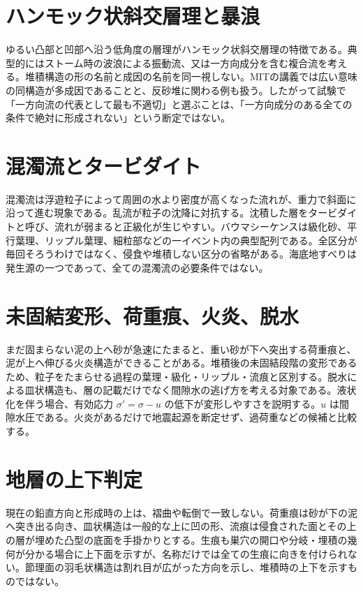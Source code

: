 \section{ハンモック状斜交層理と暴浪}
\label{theory:sediment:hcs}
ゆるい凸部と凹部へ沿う低角度の層理がハンモック状斜交層理の特徴である。典型的にはストーム時の波浪による振動流、又は一方向成分を含む複合流を考える。堆積構造の形の名前と成因の名前を同一視しない。MITの講義では広い意味の同構造が多成因であることと、反砂堆に関わる例も扱う。したがって試験で「一方向流の代表として最も不適切」と選ぶことは、「一方向成分のある全ての条件で絶対に形成されない」という断定ではない。\cite{sed_mit_cross}

\section{混濁流とタービダイト}
\label{theory:sediment:turbidite}
混濁流は浮遊粒子によって周囲の水より密度が高くなった流れが、重力で斜面に沿って進む現象である。乱流が粒子の沈降に対抗する。沈積した層をタービダイトと呼び、流れが弱まると正級化が生じやすい。バウマシーケンスは級化砂、平行葉理、リップル葉理、細粒部などの一イベント内の典型配列である。全区分が毎回そろうわけではなく、侵食や堆積しない区分の省略がある。海底地すべりは発生源の一つであって、全ての混濁流の必要条件ではない。\cite{sed_mit_environment}

\section{未固結変形、荷重痕、火炎、脱水}
\label{theory:sediment:soft}
まだ固まらない泥の上へ砂が急速にたまると、重い砂が下へ突出する荷重痕と、泥が上へ伸びる火炎構造ができることがある。堆積後の未固結段階の変形であるため、粒子をたまらせる過程の葉理・級化・リップル・流痕と区別する。脱水による皿状構造も、層の記載だけでなく間隙水の逃げ方を考える対象である。液状化を伴う場合、有効応力 \(\sigma'=\sigma-u\) の低下が変形しやすさを説明する。\(u\) は間隙水圧である。火炎があるだけで地震起源を断定せず、過荷重などの候補と比較する。\cite{sed_soft_deformation,sed_houston_structures}

\section{地層の上下判定}
\label{theory:sediment:wayup}
現在の鉛直方向と形成時の上は、褶曲や転倒で一致しない。荷重痕は砂が下の泥へ突き出る向き、皿状構造は一般的な上に凹の形、流痕は侵食された面とその上の層が埋めた凸型の底面を手掛かりとする。生痕も巣穴の開口や分岐・埋積の幾何が分かる場合に上下面を示すが、名称だけでは全ての生痕に向きを付けられない。節理面の羽毛状構造は割れ目が広がった方向を示し、堆積時の上下を示すものではない。\cite{sed_houston_structures,sed_plumose_michigan}

